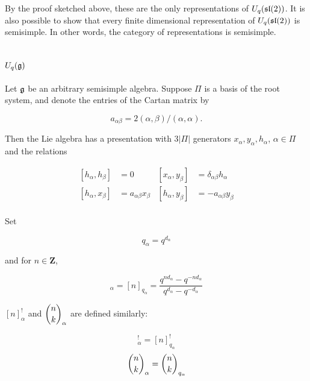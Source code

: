 By the proof sketched above, these are the only representations of
$U_q(\mathfrak{sl}(2))$. It is also possible to show that every finite dimensional
representation of $U_q(\mathfrak{sl}(2))$ is semisimple. In other words, the category of
representations is semisimple.

\section{$U_q(\mathfrak{g})$}
\label{U_q(g)}


    Let $\mathfrak{g}$ be an arbitrary semisimple algebra. Suppose $\Pi$ is
    a basis of the root system, and denote the entries of the Cartan matrix
    by 

    \begin{equation}
        a_{\alpha\beta} = 2(\alpha, \beta) / (\alpha, \alpha).
    \end{equation}

    Then the Lie algebra has a presentation with $3|\Pi|$ generators
    $x_\alpha, y_\alpha, h_\alpha$, $\alpha \in \Pi$ and the relations 

    \begin{align}
        \left[ h_\alpha, h_\beta \right] &= 0       &   \left[ x_\alpha, y_\beta \right] &= \delta_{\alpha\beta} h_\alpha \\
        \left[ h_\alpha, x_\beta \right] &= a_{\alpha\beta} x_\beta  &   \left[ h_\alpha, y_\beta \right] &= -a_{\alpha\beta} y_\beta \\
    \end{align}

    Set

    \begin{equation}
        q_\alpha = q^{d_\alpha}
    \end{equation}

    and for $n \in \mathbf{Z}$,

    \begin{equation}
        [n]_\alpha = [n]_{q_\alpha} = \frac{q^{nd_\alpha} - q^{-nd_\alpha}}{q^{d_\alpha} - q^{-d_\alpha}}
    \end{equation}

    $[n]_\alpha^!$ and $\dbinom{n}{k}_\alpha$ are defined similarly: 
    
    \begin{equation}
        [n]_\alpha^! = [n]_{q_{\alpha}}^!
    \end{equation}
    \begin{equation}
        \dbinom{n}{k}_\alpha = \dbinom{n}{k}_{q_\alpha}
    \end{equation}

